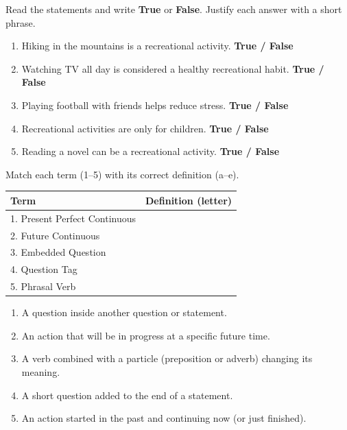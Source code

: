 \documentclass[11pt]{article}
\begin{document}
\begin{exercice}
Read the statements and write \textbf{True} or \textbf{False}. Justify each answer with a short phrase.
\begin{enumerate}
    \item Hiking in the mountains is a recreational activity. \hfill \textbf{True / False}
    \item Watching TV all day is considered a healthy recreational habit. \hfill \textbf{True / False}
    \item Playing football with friends helps reduce stress. \hfill \textbf{True / False}
    \item Recreational activities are only for children. \hfill \textbf{True / False}
    \item Reading a novel can be a recreational activity. \hfill \textbf{True / False}
\end{enumerate}
\end{exercice}

\begin{exercice}
Match each term (1--5) with its correct definition (a--e).
\begin{center}
\begin{tabularx}{\linewidth}{|l|X|}\hline
\textbf{Term} & \textbf{Definition (letter)} \\ \hline
1. Present Perfect Continuous &  \\ \hline
2. Future Continuous &  \\ \hline
3. Embedded Question &  \\ \hline
4. Question Tag &  \\ \hline
5. Phrasal Verb &  \\ \hline
\end{tabularx}
\end{center}
\begin{enumerate}
    \item[a)] A question inside another question or statement.
    \item[b)] An action that will be in progress at a specific future time.
    \item[c)] A verb combined with a particle (preposition or adverb) changing its meaning.
    \item[d)] A short question added to the end of a statement.
    \item[e)] An action started in the past and continuing now (or just finished).
\end{enumerate}
\end{exercice}
\end{document}
